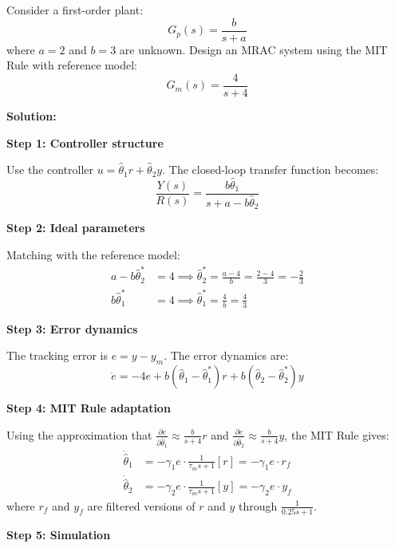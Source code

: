 \begin{examplebox}
Consider a first-order plant:
\begin{equation}
G_p(s) = \frac{b}{s + a}
\end{equation}
where $a = 2$ and $b = 3$ are unknown. Design an MRAC system using the MIT Rule with reference model:
\begin{equation}
G_m(s) = \frac{4}{s + 4}
\end{equation}

\textbf{Solution:}

\textbf{Step 1: Controller structure}

Use the controller $u = \hat{\theta}_1 r + \hat{\theta}_2 y$. The closed-loop transfer function becomes:
\begin{equation}
\frac{Y(s)}{R(s)} = \frac{b\hat{\theta}_1}{s + a - b\hat{\theta}_2}
\end{equation}

\textbf{Step 2: Ideal parameters}

Matching with the reference model:
\begin{align}
a - b\hat{\theta}_2^* &= 4 \implies \hat{\theta}_2^* = \frac{a - 4}{b} = \frac{2 - 4}{3} = -\frac{2}{3} \\
b\hat{\theta}_1^* &= 4 \implies \hat{\theta}_1^* = \frac{4}{b} = \frac{4}{3}
\end{align}

\textbf{Step 3: Error dynamics}

The tracking error is $e = y - y_m$. The error dynamics are:
\begin{equation}
\dot{e} = -4e + b(\hat{\theta}_1 - \hat{\theta}_1^*)r + b(\hat{\theta}_2 - \hat{\theta}_2^*)y
\end{equation}

\textbf{Step 4: MIT Rule adaptation}

Using the approximation that $\frac{\partial e}{\partial \hat{\theta}_1} \approx \frac{b}{s+4}r$ and $\frac{\partial e}{\partial \hat{\theta}_2} \approx \frac{b}{s+4}y$, the MIT Rule gives:
\begin{align}
\dot{\hat{\theta}}_1 &= -\gamma_1 e \cdot \frac{1}{\tau_m s + 1}[r] = -\gamma_1 e \cdot r_f \\
\dot{\hat{\theta}}_2 &= -\gamma_2 e \cdot \frac{1}{\tau_m s + 1}[y] = -\gamma_2 e \cdot y_f
\end{align}
where $r_f$ and $y_f$ are filtered versions of $r$ and $y$ through $\frac{1}{0.25s + 1}$.

\textbf{Step 5: Simulation}


\end{examplebox}

